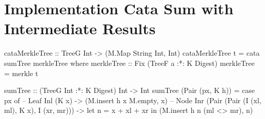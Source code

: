 \label{app-impl-cata-sum-inter-results}
\section{Implementation Cata Sum with Intermediate Results}
\begin{haskell}
cataMerkleTree :: TreeG Int -> (M.Map String Int, Int)
cataMerkleTree t = cata sumTree merkleTree
  where
    merkleTree :: Fix (TreeF a :*: K Digest)
    merkleTree = merkle t

    sumTree :: (TreeG Int :*: K Digest) Int -> Int
    sumTree (Pair (px, K h)) = case px of
      -- Leaf  
      Inl (K x)                       
        -> (M.insert h x M.empty, x) 
      -- Node
      Inr (Pair (Pair (I (xl, ml), K x), I (xr, mr))) 
        -> let n = x + xl + xr 
           in (M.insert h n (ml <> mr), n) 
\end{haskell}